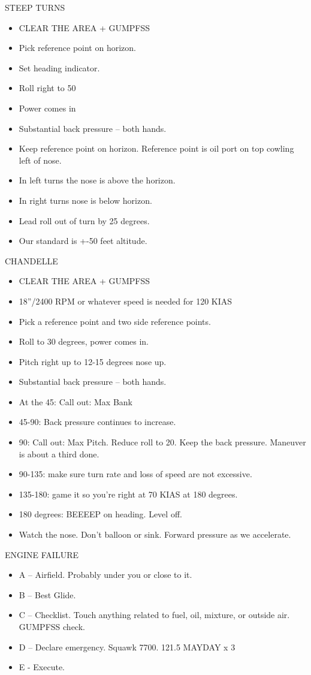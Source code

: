 STEEP TURNS
\begin{itemize}
    \item CLEAR THE AREA + GUMPFSS
    \item Pick reference point on horizon.
    \item Set heading indicator.
    \item Roll right to 50
    \item Power comes in
    \item Substantial back pressure – both hands.
    \item Keep reference point on horizon. Reference point is oil port on top cowling left of nose.
    \item In left turns the nose is above the horizon.
    \item In right turns nose is below horizon.
    \item Lead roll out of turn by 25 degrees.
    \item Our standard is +-50 feet altitude.
\end{itemize}

CHANDELLE
\begin{itemize}
    \item CLEAR THE AREA + GUMPFSS
    \item 18”/2400 RPM or whatever speed is needed for 120 KIAS
    \item Pick a reference point and two side reference points.
    \item Roll to 30 degrees, power comes in.
    \item Pitch right up to 12-15 degrees nose up.
    \item Substantial back pressure – both hands.
    \item At the 45: Call out: Max Bank
    \item 45-90: Back pressure continues to increase.
    \item 90: Call out: Max Pitch. Reduce roll to 20. Keep the back pressure. Maneuver is about a third done.
    \item 90-135: make sure turn rate and loss of speed are not excessive.
    \item 135-180: game it so you’re right at 70 KIAS at 180 degrees.
    \item 180 degrees: BEEEEP on heading. Level off.
    \item Watch the nose. Don’t balloon or sink. Forward pressure as we accelerate.
\end{itemize}

ENGINE FAILURE
\begin{itemize}
    \item A – Airfield. Probably under you or close to it.
    \item B – Best Glide.
    \item C – Checklist. Touch anything related to fuel, oil, mixture, or outside air. GUMPFSS check.
    \item D – Declare emergency. Squawk 7700. 121.5 MAYDAY x 3
    \item E - Execute.
\end{itemize}

